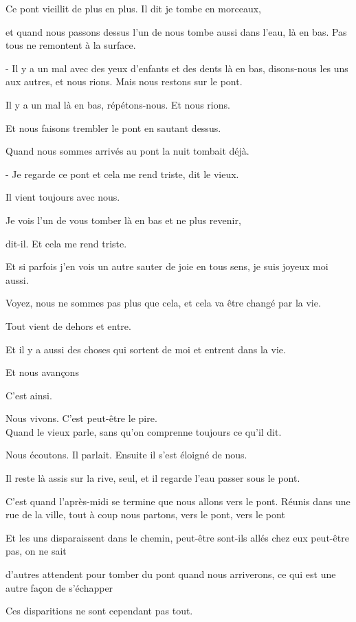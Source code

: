 Ce pont vieillit de plus en plus. Il dit je tombe en morceaux,

et quand nous passons dessus l'un de nous tombe aussi dans l'eau, là en
bas. Pas tous ne remontent à la surface.

- Il y a un mal avec des yeux d'enfants et des dents là en bas,
disons-nous les uns aux autres, et nous rions. Mais nous restons sur le
pont.

Il y a un mal là en bas, répétons-nous. Et nous rions.

Et nous faisons trembler le pont en sautant dessus.

Quand nous sommes arrivés au pont la nuit tombait déjà.

- Je regarde ce pont et cela me rend triste, dit le vieux.

Il vient toujours avec nous.

Je vois l'un de vous tomber là en bas et ne plus revenir,

dit-il. Et cela me rend triste.

Et si parfois j'en vois un autre sauter de joie en tous sens, je suis
joyeux moi aussi.

Voyez, nous ne sommes pas plus que cela, et cela va être changé par la
vie.

Tout vient de dehors et entre.

Et il y a aussi des choses qui sortent de moi et entrent dans la vie.

Et nous avançons

C'est ainsi.

Nous vivons. C'est peut-être le pire.\\

Quand le vieux parle, sans qu'on comprenne toujours ce qu'il dit.

Nous écoutons. Il parlait. Ensuite il s'est éloigné de nous.

Il reste là assis sur la rive, seul, et il regarde l'eau passer sous le
pont.

C'est quand l'après-midi se termine que nous allons vers le pont. Réunis
dans une rue de la ville, tout à coup nous partons, vers le pont, vers
le pont

Et les uns disparaissent dans le chemin, peut-être sont-ils allés chez
eux peut-être pas, on ne sait

d'autres attendent pour tomber du pont quand nous arriverons, ce qui est
une autre façon de s'échapper

Ces disparitions ne sont cependant pas tout.

